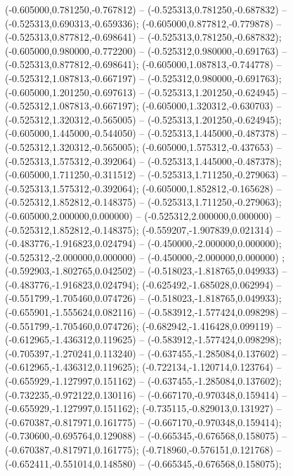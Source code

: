  (-0.605000,0.781250,-0.767812) -- (-0.525313,0.781250,-0.687832) -- (-0.525313,0.690313,-0.659336);
 (-0.605000,0.877812,-0.779878) -- (-0.525313,0.877812,-0.698641) -- (-0.525313,0.781250,-0.687832);
 (-0.605000,0.980000,-0.772200) -- (-0.525312,0.980000,-0.691763) -- (-0.525313,0.877812,-0.698641);
 (-0.605000,1.087813,-0.744778) -- (-0.525312,1.087813,-0.667197) -- (-0.525312,0.980000,-0.691763);
 (-0.605000,1.201250,-0.697613) -- (-0.525313,1.201250,-0.624945) -- (-0.525312,1.087813,-0.667197);
 (-0.605000,1.320312,-0.630703) -- (-0.525312,1.320312,-0.565005) -- (-0.525313,1.201250,-0.624945);
 (-0.605000,1.445000,-0.544050) -- (-0.525313,1.445000,-0.487378) -- (-0.525312,1.320312,-0.565005);
 (-0.605000,1.575312,-0.437653) -- (-0.525313,1.575312,-0.392064) -- (-0.525313,1.445000,-0.487378);
 (-0.605000,1.711250,-0.311512) -- (-0.525313,1.711250,-0.279063) -- (-0.525313,1.575312,-0.392064);
 (-0.605000,1.852812,-0.165628) -- (-0.525312,1.852812,-0.148375) -- (-0.525313,1.711250,-0.279063);
 (-0.605000,2.000000,0.000000) -- (-0.525312,2.000000,0.000000) -- (-0.525312,1.852812,-0.148375);
 (-0.559207,-1.907839,0.021314) -- (-0.483776,-1.916823,0.024794) -- (-0.450000,-2.000000,0.000000);
 (-0.525312,-2.000000,0.000000) -- (-0.450000,-2.000000,0.000000) ;
 (-0.592903,-1.802765,0.042502) -- (-0.518023,-1.818765,0.049933) -- (-0.483776,-1.916823,0.024794);
 (-0.625492,-1.685028,0.062994) -- (-0.551799,-1.705460,0.074726) -- (-0.518023,-1.818765,0.049933);
 (-0.655901,-1.555624,0.082116) -- (-0.583912,-1.577424,0.098298) -- (-0.551799,-1.705460,0.074726);
 (-0.682942,-1.416428,0.099119) -- (-0.612965,-1.436312,0.119625) -- (-0.583912,-1.577424,0.098298);
 (-0.705397,-1.270241,0.113240) -- (-0.637455,-1.285084,0.137602) -- (-0.612965,-1.436312,0.119625);
 (-0.722134,-1.120714,0.123764) -- (-0.655929,-1.127997,0.151162) -- (-0.637455,-1.285084,0.137602);
 (-0.732235,-0.972122,0.130116) -- (-0.667170,-0.970348,0.159414) -- (-0.655929,-1.127997,0.151162);
 (-0.735115,-0.829013,0.131927) -- (-0.670387,-0.817971,0.161775) -- (-0.667170,-0.970348,0.159414);
 (-0.730600,-0.695764,0.129088) -- (-0.665345,-0.676568,0.158075) -- (-0.670387,-0.817971,0.161775);
 (-0.718960,-0.576151,0.121768) -- (-0.652411,-0.551014,0.148580) -- (-0.665345,-0.676568,0.158075);

